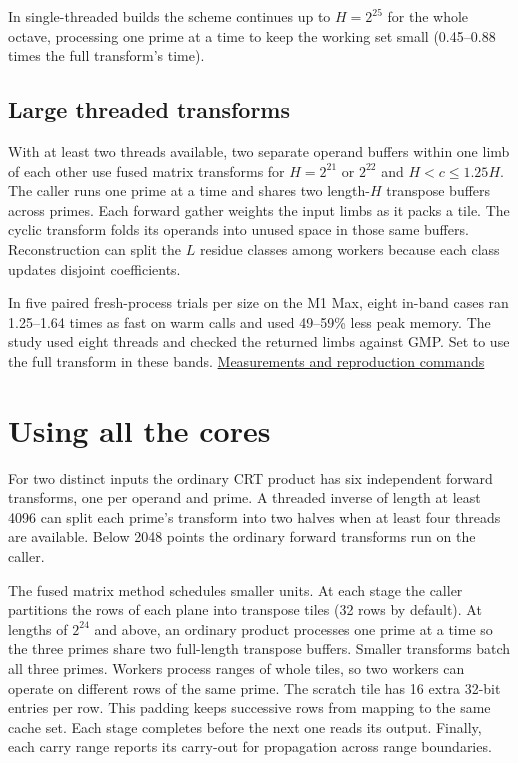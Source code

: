 In single-threaded builds the scheme continues up to $H = 2^{25}$ for the whole octave,
processing one prime at a time to keep the working set small (0.45--0.88 times the full
transform's time).

\subsection{Large threaded transforms}

With at least two threads available, two separate operand buffers within one limb
of each other use fused matrix transforms for $H = 2^{21}$ or $2^{22}$ and
$H < c \le 1.25H$. The caller runs one prime at a time and shares two length-$H$
transpose buffers across primes. Each forward gather weights the input limbs
as it packs a tile. The cyclic transform folds its operands into unused space
in those same buffers. Reconstruction can split the $L$ residue classes among
workers because each class updates disjoint coefficients.

\begin{perfnote}
In five paired fresh-process trials per size on the M1 Max, eight in-band cases
ran 1.25--1.64 times as fast on warm calls and used 49--59\% less peak memory.
The study used eight threads and checked the returned limbs against GMP.
Set  to use the full transform in these
bands. \href{https://github.com/mmurshed/biginteger/blob/main/docs/MULTIPLICATION.md#threaded-h--l-with-fused-matrix-transforms}{Measurements and reproduction commands}
\end{perfnote}

\clearpage
\section{Using all the cores}
\label{sec:nttthreads}

For two distinct inputs the ordinary CRT product has six independent forward
transforms, one per operand and prime. A threaded inverse of length at least
4096 can split each prime's transform into two halves when at least four threads
are available. Below 2048 points the ordinary forward transforms run on the caller.

The fused matrix method schedules smaller units. At each stage the caller partitions
the rows of each plane into transpose tiles (32 rows by default). At lengths of $2^{24}$
and above, an ordinary product processes one prime at a time so the three primes share
two full-length transpose buffers. Smaller transforms batch all three primes. Workers process
ranges of whole tiles, so two workers can operate on different rows of the same
prime. The scratch tile has 16 extra 32-bit entries per row. This padding keeps
successive rows from mapping to the same cache set. Each stage completes before
the next one reads its output. Finally, each carry range reports its carry-out
for propagation across range boundaries.

